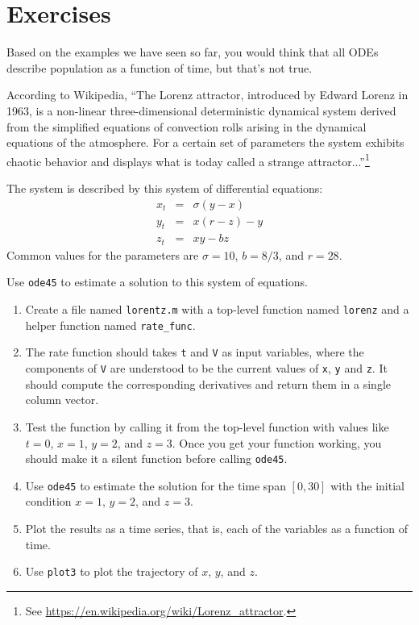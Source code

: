 \documentclass[
]{book}
\numberwithin{Answer}{chapter}
\numberwithin{Exercise}{chapter}
\begin{document}
\section{Exercises}

\begin{ex}

Based on the examples we have seen so far, you would think that
all ODEs describe population as
a function of time, but that's not true.

According to Wikipedia,
``The Lorenz attractor, introduced by Edward Lorenz in 1963, is a
non-linear three-dimensional deterministic dynamical system derived
from the simplified equations of convection rolls arising in the
dynamical equations of the atmosphere. For a certain set of parameters
the system exhibits chaotic behavior and displays what is today called
a strange attractor...''\footnote{See \url{https://en.wikipedia.org/wiki/Lorenz_attractor}.}

The system is described by this system of differential equations:
%
\begin{eqnarray}
x_t &=& \sigma (y - x)  \\
y_t &=& x (r - z) - y   \\
z_t &=& xy - b z
\end{eqnarray}
%
Common values for the parameters are $\sigma = 10$, $b = 8/3$, and $r=28$.

Use {\tt ode45} to estimate a solution to this
system of equations.


\begin{enumerate}

\item Create a file named {\tt lorentz.m} with a top-level function named {\tt lorenz} and a helper function named \verb"rate_func".

\item  The rate function should
takes {\tt t} and {\tt V} as input variables, where the components
of {\tt V} are understood to be the current values of {\tt x},
{\tt y} and {\tt z}.  It should compute the corresponding derivatives
and return them in a single column vector.

\item Test the function by calling it from the top-level function with values like $t=0$, $x=1$, $y=2$, and $z=3$.  Once you get your function working, you should make it a silent function before calling {\tt ode45}.

\item Use {\tt ode45}
to estimate the solution for the time span $[0, 30]$
with the initial condition $x=1$, $y=2$, and $z=3$.

\item Plot the results as a time series, that is, each of the variables as a function of time.

\item Use {\tt plot3} to plot the trajectory of
$x$, $y$, and $z$.

\end{enumerate}

\end{ex}
\end{document}
